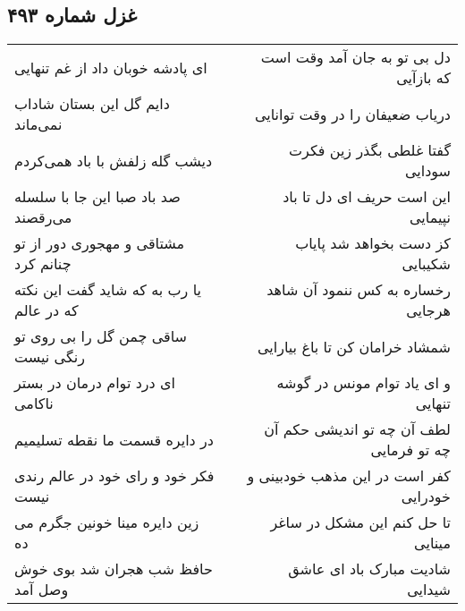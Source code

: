 \begin{center}
\section*{غزل شماره ۴۹۳}
\label{sec:sh493}
\begin{longtable}{l p{0.5cm} r}
ای پادشه خوبان داد از غم تنهایی
&&
دل بی تو به جان آمد وقت است که بازآیی
\\
دایم گل این بستان شاداب نمی‌ماند
&&
دریاب ضعیفان را در وقت توانایی
\\
دیشب گله زلفش با باد همی‌کردم
&&
گفتا غلطی بگذر زین فکرت سودایی
\\
صد باد صبا این جا با سلسله می‌رقصند
&&
این است حریف ای دل تا باد نپیمایی
\\
مشتاقی و مهجوری دور از تو چنانم کرد
&&
کز دست بخواهد شد پایاب شکیبایی
\\
یا رب به که شاید گفت این نکته که در عالم
&&
رخساره به کس ننمود آن شاهد هرجایی
\\
ساقی چمن گل را بی روی تو رنگی نیست
&&
شمشاد خرامان کن تا باغ بیارایی
\\
ای درد توام درمان در بستر ناکامی
&&
و ای یاد توام مونس در گوشه تنهایی
\\
در دایره قسمت ما نقطه تسلیمیم
&&
لطف آن چه تو اندیشی حکم آن چه تو فرمایی
\\
فکر خود و رای خود در عالم رندی نیست
&&
کفر است در این مذهب خودبینی و خودرایی
\\
زین دایره مینا خونین جگرم می ده
&&
تا حل کنم این مشکل در ساغر مینایی
\\
حافظ شب هجران شد بوی خوش وصل آمد
&&
شادیت مبارک باد ای عاشق شیدایی
\\
\end{longtable}
\end{center}
